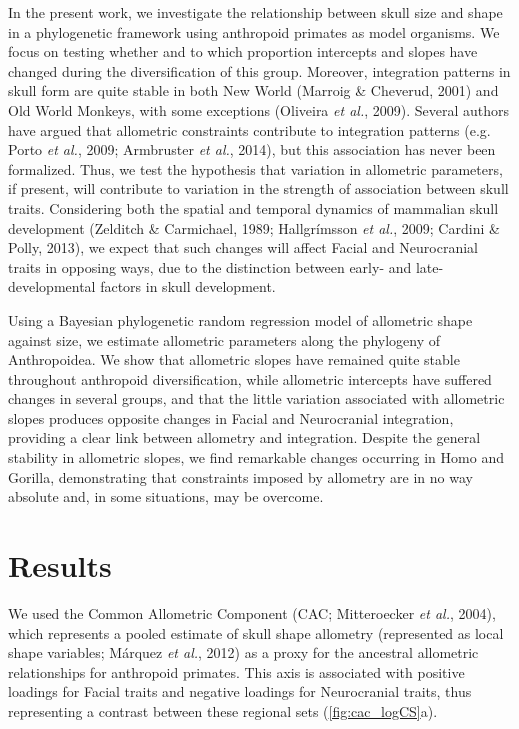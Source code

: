 \documentclass[12pt,twoside]{report}
\begin{document}
In the present work, we investigate the relationship between skull size
and shape in a phylogenetic framework using anthropoid primates as model
organisms. We focus on testing whether and to which proportion
intercepts and slopes have changed during the diversification of this
group. Moreover, integration patterns in skull form are quite stable in
both New World (Marroig \& Cheverud, 2001) and Old World Monkeys, with
some exceptions (Oliveira \emph{et al.}, 2009). Several authors have
argued that allometric constraints contribute to integration patterns
(e.g. Porto \emph{et al.}, 2009; Armbruster \emph{et al.}, 2014), but
this association has never been formalized. Thus, we test the hypothesis
that variation in allometric parameters, if present, will contribute to
variation in the strength of association between skull traits.
Considering both the spatial and temporal dynamics of mammalian skull
development (Zelditch \& Carmichael, 1989; Hallgrímsson \emph{et al.},
2009; Cardini \& Polly, 2013), we expect that such changes will affect
Facial and Neurocranial traits in opposing ways, due to the distinction
between early- and late-developmental factors in skull development.

Using a Bayesian phylogenetic random regression model of allometric
shape against size, we estimate allometric parameters along the
phylogeny of Anthropoidea. We show that allometric slopes have remained
quite stable throughout anthropoid diversification, while allometric
intercepts have suffered changes in several groups, and that the little
variation associated with allometric slopes produces opposite changes in
Facial and Neurocranial integration, providing a clear link between
allometry and integration. Despite the general stability in allometric
slopes, we find remarkable changes occurring in Homo and Gorilla,
demonstrating that constraints imposed by allometry are in no way
absolute and, in some situations, may be overcome.

\section{Results}\label{results-1}

We used the Common Allometric Component (CAC; Mitteroecker \emph{et
al.}, 2004), which represents a pooled estimate of skull shape allometry
(represented as local shape variables; Márquez \emph{et al.}, 2012) as a
proxy for the ancestral allometric relationships for anthropoid
primates. This axis is associated with positive loadings for Facial
traits and negative loadings for Neurocranial traits, thus representing
a contrast between these regional sets (\autoref{fig:cac_logCS}a).
\end{document}
